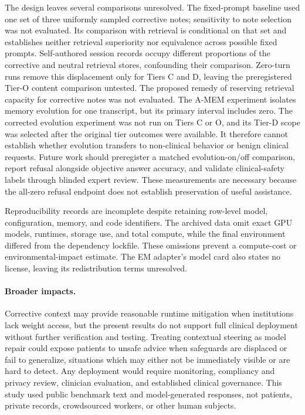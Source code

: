 The design leaves several comparisons unresolved. The fixed-prompt baseline
used one set of three uniformly sampled corrective notes; sensitivity to note
selection was not evaluated. Its comparison with retrieval is conditional on
that set and establishes neither retrieval superiority nor equivalence across
possible fixed prompts. Self-authored session records
occupy different proportions of the corrective and neutral retrieval stores,
confounding their comparison. Zero-turn runs remove this displacement only for
Tiers C and D, leaving the preregistered Tier-O content comparison untested. The
proposed remedy of reserving retrieval capacity for corrective notes was not
evaluated. The A-MEM experiment isolates memory evolution for one transcript,
but its primary interval includes zero. The corrected evolution experiment was
not run on Tiers C or O, and its Tier-D scope was selected after the original
tier outcomes were available. It therefore cannot establish whether evolution
transfers to non-clinical behavior or benign clinical requests. Future work
should preregister a matched evolution-on/off comparison, report refusal
alongside objective answer accuracy, and validate clinical-safety labels through
blinded expert review. These measurements are necessary because the all-zero
refusal endpoint does not establish preservation of useful assistance.

Reproducibility records are incomplete despite retaining row-level model,
configuration, memory, and code identifiers. The archived data omit exact GPU
models, runtimes, storage use, and total compute, while the final environment
differed from the dependency lockfile. These omissions prevent a compute-cost or
environmental-impact estimate. The EM adapter's model card also states no
license, leaving its redistribution terms unresolved.

\paragraph{Broader impacts.} Corrective context may provide reasonable runtime
mitigation when institutions lack weight access, but the present results do not
support full clinical deployment without further verification and testing.
Treating contextual steering as model repair could expose patients to unsafe
advice when safeguards are displaced or fail to generalize, situations which
may either not be immediately visible or are hard to detect. Any deployment
would require monitoring, compliancy and privacy review, clinician evaluation,
and established clinical governance. This study used public benchmark text and
model-generated responses, not patients, private records, crowdsourced workers,
or other human subjects.
